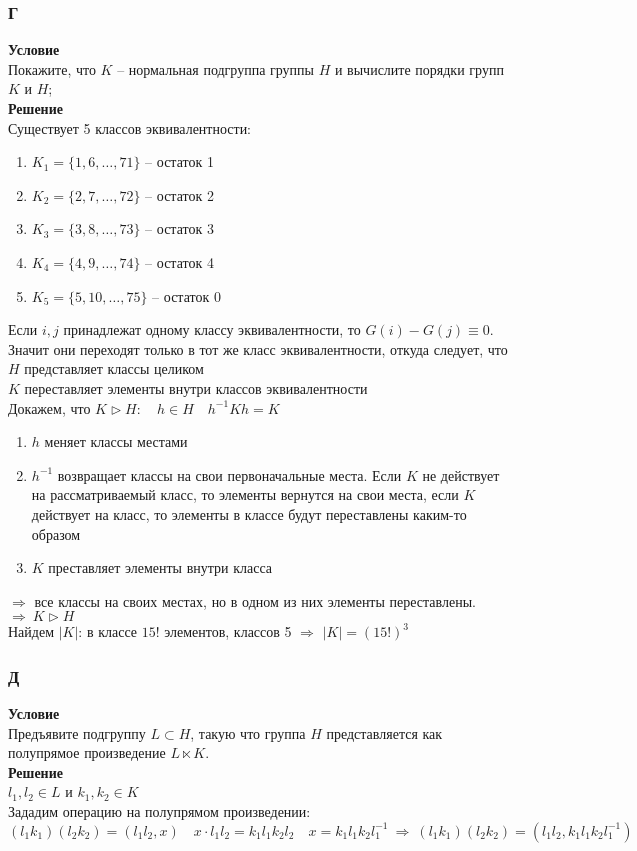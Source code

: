 			\subsubsection*{\textbf{Г}}
			\textbf{Условие}\\
			Покажите, что $K$ -- нормальная подгруппа группы $H$ и вычислите порядки групп $K$ и $H$;
			\\
			\textbf{Решение}\\
			Существует 5 классов эквивалентности:
			\begin{enumerate}
				\item $K_{1} = \{1, 6, \ldots, 71\}$ -- остаток 1
				\item $K_{2} = \{2, 7, \ldots, 72\}$ -- остаток 2
				\item $K_{3} = \{3, 8, \ldots, 73\}$ -- остаток 3
				\item $K_{4} = \{4, 9, \ldots, 74\}$ -- остаток 4
				\item $K_{5} = \{5, 10, \ldots, 75\}$ -- остаток 0
			\end{enumerate}
			Если $i,j$ принадлежат одному классу эквивалентности, то $G(i) - G(j) \equiv 0$. Значит они переходят только в тот же класс эквивалентности, откуда следует, что $H$ представляет классы целиком\\
			$K$ переставляет элементы внутри классов эквивалентности\\
			Докажем, что $K \rhd H:\quad h \in H\quad h^{-1}Kh = K$\\
			\begin{enumerate}
				\item $h$ меняет классы местами
				\item $h^{-1}$ возвращает классы на свои первоначальные места. Если $K$ не действует на рассматриваемый класс, то элементы вернутся на свои места, если $K$ действует на класс, то элементы в классе будут переставлены каким-то образом
				\item $K$ преставляет элементы внутри класса
			\end{enumerate}
			$\Rightarrow$ все классы на своих местах, но в одном из них элементы переставлены. $\Rightarrow\ K \rhd H$\\
			Найдем $|K|$: в классе $15!$ элементов, классов 5 $\Rightarrow$ $|K| = (15!)^{3}$ 
			
			\subsubsection*{\textbf{Д}}
			\textbf{Условие}\\
			Предъявите подгруппу $L \subset H$, такую что группа $H$ представляется как полупрямое произведение $L \ltimes K$.
			\\
			\textbf{Решение}\\
			$l_{1},l_{2} \in L$ и $k_{1},k_{2} \in K$\\
			Зададим операцию на полупрямом произведении: $(l_{1}k_{1})(l_{2}k_{2}) = (l_{1}l_{2}, x)\quad x \cdot l_{1}l_{2} = k_{1}l_{1}k_{2}l_{2}\quad x = k_{1}l_{1}k_{2}l^{-1}_{1}\ \Rightarrow\ (l_{1}k_{1})(l_{2}k_{2}) = (l_{1}l_{2}, k_{1}l_{1}k_{2}l^{-1}_{1})$
			

